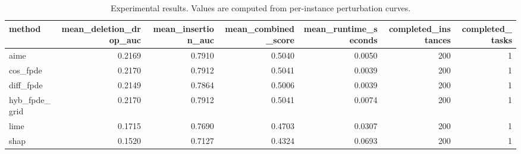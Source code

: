 \begin{table}[t]
\caption{Experimental results. Values are computed from per-instance perturbation curves.}
\label{tab:main_results_computed}
\centering
\begin{tabular}{lrrrrrr}
\toprule
method & mean\_deletion\_drop\_auc & mean\_insertion\_auc & mean\_combined\_score & mean\_runtime\_seconds & completed\_instances & completed\_tasks \\
\midrule
aime & 0.2169 & 0.7910 & 0.5040 & 0.0050 & 200 & 1 \\
cos\_fpde & 0.2170 & 0.7912 & 0.5041 & 0.0039 & 200 & 1 \\
diff\_fpde & 0.2149 & 0.7864 & 0.5006 & 0.0039 & 200 & 1 \\
hyb\_fpde\_grid & 0.2170 & 0.7912 & 0.5041 & 0.0074 & 200 & 1 \\
lime & 0.1715 & 0.7690 & 0.4703 & 0.0307 & 200 & 1 \\
shap & 0.1520 & 0.7127 & 0.4324 & 0.0693 & 200 & 1 \\
\bottomrule
\end{tabular}

\end{table}
